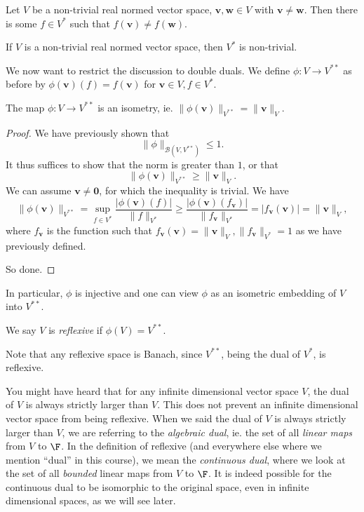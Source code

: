 \documentclass[a4paper]{article}
\begin{document}
\begin{cor}
  Let $V$ be a non-trivial real normed vector space, $\mathbf{v}, \mathbf{w}\in V$ with $\mathbf{v}\not= \mathbf{w}$. Then there is some $f\in V^*$ such that $f(\mathbf{v}) \not= f(\mathbf{w})$.
\end{cor}

\begin{cor}
  If $V$ is a non-trivial real normed vector space, then $V^*$ is non-trivial.
\end{cor}

We now want to restrict the discussion to double duals. We define $\phi: V\to V^{**}$ as before by $\phi(\mathbf{v})(f) = f(\mathbf{v})$ for $\mathbf{v}\in V, f\in V^*$.

\begin{prop}
  The map $\phi: V\to V^{**}$ is an isometry, ie. $\|\phi(\mathbf{v})\|_{V^{**}} = \|\mathbf{v}\|_V$.
\end{prop}

\begin{proof}
  We have previously shown that
  \[
    \|\phi\|_{\mathcal{B}(V, V^{**})} \leq 1.
  \]
  It thus suffices to show that the norm is greater than $1$, or that
  \[
    \|\phi(\mathbf{v})\|_{V^{**}} \geq \|\mathbf{v}\|_V.
  \]
  We can assume $\mathbf{v}\not= \mathbf{0}$, for which the inequality is trivial. We have
  \[
    \|\phi(\mathbf{v})\|_{V^{**}} = \sup_{f\in V^*} \frac{|\phi(\mathbf{v})(f)|}{\|f\|_{V^*}} \geq \frac{|\phi(\mathbf{v})(f_\mathbf{v})|}{\|f_\mathbf{v}\|_{V^*}} = |f_\mathbf{v}(\mathbf{v})| = \|\mathbf{v}\|_V,
  \]
  where $f_\mathbf{v}$ is the function such that $f_\mathbf{v}(\mathbf{v}) = \|\mathbf{v}\|_V, \|f_\mathbf{v}\|_{V^*} = 1$ as we have previously defined.

  So done.
\end{proof}

In particular, $\phi$ is injective and one can view $\phi$ as an isometric embedding of $V$ into $V^{**}$.

\begin{defi}[Reflexive]
  We say $V$ is \emph{reflexive} if $\phi(V) = V^{**}$.
\end{defi}
Note that any reflexive space is Banach, since $V^{**}$, being the dual of $V^*$, is reflexive.

You might have heard that for any infinite dimensional vector space $V$, the dual of $V$ is always strictly larger than $V$. This does not prevent an infinite dimensional vector space from being reflexive. When we said the dual of $V$ is always strictly larger than $V$, we are referring to the \emph{algebraic dual}, ie. the set of all \emph{linear maps} from $V$ to $\F$. In the definition of reflexive (and everywhere else where we mention ``dual'' in this course), we mean the \emph{continuous dual}, where we look at the set of all \emph{bounded} linear maps from $V$ to $\F$. It is indeed possible for the continuous dual to be isomorphic to the original space, even in infinite dimensional spaces, as we will see later.
\end{document}
